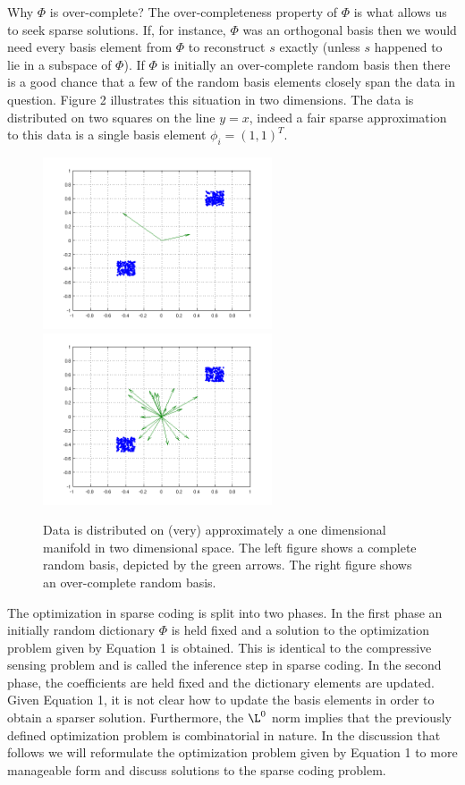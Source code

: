 \documentclass[12pt,a4paper]{article}
\begin{document}
Why $\Phi$ is over-complete? The over-completeness property of $\Phi$ is what allows us to seek sparse solutions. If, for instance, $\Phi$ was an orthogonal basis then we would need every basis element from $\Phi$ to reconstruct $s$ exactly (unless $s$ happened to lie in a subspace of $\Phi$). If $\Phi$ is initially an over-complete random basis then there is a good chance that a few of the random basis elements closely span the data in question. Figure 2 illustrates this situation in two dimensions. The data is distributed on two squares on the line $y=x$, indeed a fair sparse approximation to this data is a single basis element $\phi_i=(1,1)^T$. 
 
\begin{figure}
\centering
\includegraphics[height=2in]{basis.png}
\includegraphics[height=2in]{overcomplete.png}
\caption{ \small {Data is distributed on (very) approximately a one dimensional manifold in two dimensional space. The left figure shows a complete random basis, depicted by the green arrows. The right figure shows an over-complete random basis.}}  
\end{figure}

The optimization in sparse coding is split into two phases. In the first phase an initially random dictionary $\Phi$ is held fixed and a solution to the optimization problem given by Equation 1 is obtained. This is identical to the compressive sensing problem and is called the inference step in sparse coding. In the second phase, the coefficients are held fixed and the dictionary elements are updated. Given Equation 1, it is not clear how to update the basis elements in order to obtain a sparser solution. Furthermore, the $\L^0$ norm implies that the previously defined optimization problem is combinatorial in nature. In the discussion that follows we will reformulate the optimization problem given by Equation 1 to more manageable form and discuss solutions to the sparse coding problem. 
\end{document}
